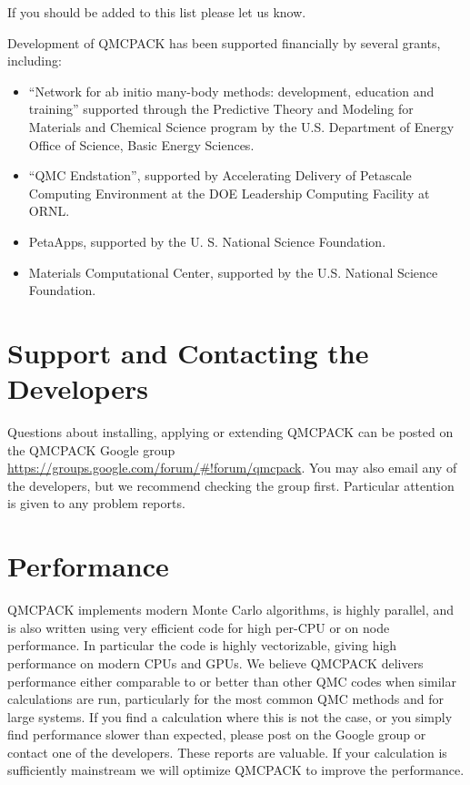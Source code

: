 If you should be added to this list please let us know.

Development of QMCPACK has been supported financially by
several grants, including:

\begin{itemize}
\item ``Network for ab initio many-body methods: development, education
  and training'' supported through the Predictive
  Theory and Modeling for Materials and Chemical Science program by
  the U.S. Department of Energy Office of Science, Basic Energy
  Sciences.
\item ``QMC Endstation'', supported by Accelerating Delivery of Petascale
  Computing Environment at the DOE Leadership Computing Facility at
  ORNL.
\item PetaApps, supported by the U. S. National Science
  Foundation.
\item Materials Computational Center, supported by the
  U.S. National Science Foundation.
\end{itemize}


\section{Support and Contacting the Developers}
\label{sec:support}

Questions about installing, applying or extending QMCPACK can be
posted on the QMCPACK Google group
\url{https://groups.google.com/forum/#!forum/qmcpack}. You may also
email any of the developers, but we recommend checking the group
first. Particular attention is given to any problem reports.

\section{Performance}
\label{sec:performance}

QMCPACK implements modern Monte Carlo algorithms, is highly parallel,
and is also written using very efficient code for high per-CPU or on
node performance. In particular the code is highly vectorizable,
giving high performance on modern CPUs and GPUs. We believe QMCPACK
delivers performance either comparable to or better than other QMC
codes when similar calculations are run, particularly for the most
common QMC methods and for large systems. If you find a calculation where this is not the
case, or you simply find performance slower than expected, please post on the Google
group or contact one of the developers. These reports are valuable. If your calculation is
sufficiently mainstream we will optimize QMCPACK to improve
the performance.

